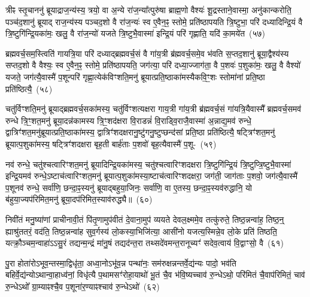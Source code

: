 {\anuvakamend[{विप्रा॑नुमदित॒ इत्या॑ह च॒नास्मै॒ होतो॑प॒भृद्दे॒वता॑ ए॒व त्रीणि॑ च}]}%

त्रीꣴ स्तृ॒चाननु॑ ब्रूयाद्राज॒न्य॑स्य॒ त्रयो॒ वा अ॒न्ये रा॑ज॒न्या᳚त्पुरु॑षा ब्राह्म॒णो वैश्यः॑ शू॒द्रस्ताने॒वास्मा॒ अनु॑कान्करोति॒ पञ्च॑द॒शानु॑ ब्रूयाद् राज॒न्य॑स्य पञ्चद॒शो वै रा॑ज॒न्यः॑ स्व ए॒वैन॒ꣴ॒ स्तोमे॒ प्रति॑\-ष्ठापयति त्रि॒ष्टुभा॒ परि॑ दध्यादिन्द्रि॒यं वै त्रि॒ष्टुगि॑न्द्रि॒यका॑मः॒ खलु॒ वै रा॑ज॒न्यो॑ यजते त्रि॒ष्टुभै॒वास्मा॑ इन्द्रि॒यं परि॑ गृह्णाति॒ यदि॑ का॒मये॑त~(५७)

ब्रह्मवर्च॒सम॒स्त्विति॑ गायत्रि॒या परि॑ दध्याद्ब्रह्मवर्च॒सं वै गा॑य॒त्री ब्र॑ह्मवर्च॒समे॒व भ॑वति स॒प्तद॒शानु॑ ब्रूया॒द्वैश्य॑स्य सप्तद॒शो वै वैश्यः॒ स्व ए॒वैन॒ꣴ॒ स्तोमे॒ प्रति॑\-ष्ठापयति॒ जग॑त्या॒ परि॑ दध्या॒ज्जाग॑ता॒ वै प॒शवः॑ प॒शुका॑मः॒ खलु॒ वै वैश्यो॑ यजते॒ जग॑त्यै॒वास्मै॑ प॒शून्परि॑ गृह्णा॒त्येक॑विꣳशति॒मनु॑ ब्रूयात्प्रति॒ष्ठाका॑मस्यैकवि॒ꣳ॒शः स्तोमा॑नां प्रति॒ष्ठा प्रति॑ष्ठित्यै॒~(५८)

चतु॑र्विꣳशति॒मनु॑ ब्रूयाद्ब्रह्मवर्च॒सका॑मस्य॒ चतु॑र्विꣳशत्यक्षरा गाय॒त्री गा॑य॒त्री ब्र॑ह्मवर्च॒सं गा॑यत्रि॒यैवास्मै᳚ ब्रह्मवर्च॒समव॑ रुन्धे त्रि॒ꣳ॒शत॒\-मनु॑ ब्रूया॒दन्न॑कामस्य त्रि॒ꣳ॒शद॑क्षरा वि॒राडन्नं॑ वि॒राड्वि॒रा\-जै॒\-वा\-स्मा॑ अ॒न्नाद्\-य॒\-मव॑ रुन्धे॒ द्वात्रिꣳ॑शत॒\-मनु॑\-ब्रूयात्प्र\-ति॒ष्ठा\-का॑मस्य॒ द्वात्रिꣳ॑शद\-क्षरा\-नु॒ष्टु॑ग\-नु॒ष्टुप्छन्द॑सां प्रति॒ष्ठा प्रति॑ष्ठित्यै॒ षट्त्रिꣳ॑शत॒मनु॑ ब्रूयात्प॒शुका॑मस्य॒ षट्त्रिꣳ॑शदक्षरा बृह॒ती बार्\mbox{}ह॑ताः प॒शवो॑ बृह॒त्यैवास्मै॑ प॒शू-~(५९)

नव॑ रुन्धे॒ चतु॑श्चत्वारिꣳशत॒मनु॑ ब्रूयादिन्द्रि॒यका॑मस्य॒ चतु॑श्चत्वारिꣳशदक्षरा त्रि॒ष्टुगि॑न्द्रि॒यं त्रि॒ष्टुप्त्रि॒ष्टुभै॒वास्मा॑ इन्द्रि॒यमव॑ रुन्धे॒\-ऽष्टाच॑त्वारिꣳशत॒मनु॑ ब्रूयात्प॒शुका॑मस्या॒ष्टाच॑त्वारिꣳशदक्षरा॒ जग॑ती॒ जाग॑ताः प॒शवो॒ जग॑त्यै॒वास्मै॑ प॒शूनव॑ रुन्धे॒ सर्वा॑णि॒ छन्दा॒ꣴ॒स्यनु॑ ब्रूयाद्बहुया॒जिनः॒ सर्वा॑णि॒ वा ए॒तस्य॒ छन्दा॒ꣴ॒स्यव॑रुद्धानि॒ यो ब॑हुया॒ज्यप॑रिमित॒मनु॑ ब्रूया॒दप॑रिमित॒स्याव॑रुद्ध्यै॥~(६०)

{\anuvakamend[{का॒मये॑त॒ प्रति॑ष्ठित्यै प॒शून्थ्स॒प्तच॑त्वारिꣳशच्च}]}%

निवी॑तं मनु॒ष्या॑णां प्राचीनावी॒तं पि॑तृ॒णामुप॑वीतं दे॒वाना॒मुप॑ व्ययते देवल॒क्ष्ममे॒व तत्कु॑रुते॒ तिष्ठ॒न्नन्वा॑ह॒ तिष्ठ॒न्॒ ह्याश्रु॑ततरं॒ वद॑ति॒ तिष्ठ॒न्नन्वा॑ह सुव॒र्गस्य॑ लो॒कस्या॒भिजि॑त्या॒ आसी॑नो यजत्य॒स्मिन्ने॒व लो॒के प्रति॑ तिष्ठति॒ यत्क्रौ॒ञ्चम॒न्वाहा॑\-ऽऽ\-सु॒रं तद्यन्म॒न्द्रं मा॑नु॒षं तद्यद॑न्त॒रा तथ्सदे॑वमन्त॒रानूच्यꣳ॑ सदेव॒त्वाय॑ वि॒द्वाꣳसो॒ वै~(६१)

पु॒रा होता॑रो\-ऽभूव॒न्तस्मा॒द्विधृ॑ता॒ अध्वा॒नो\-ऽभू॑व॒न्न पन्था॑नः॒ सम॑रुक्षन्नन्तर्वे॒द्य॑न्यः पादो॒ भव॑ति बहिर्वे॒द्य॑न्यो\-ऽथान्वा॒हाध्व॑नां॒ विधृ॑त्यै प॒थामसꣳ॑रोहा॒याथो॑ भू॒तं चै॒व भ॑वि॒ष्यच्चाव॑ रु॒न्धे\-ऽथो॒ परि॑मितं चै॒वाप॑रिमितं॒ चाव॑ रु॒न्धे\-ऽथो᳚ ग्रा॒म्याꣴश्चै॒व प॒शूना॑र॒ण्याꣴश्चाव॑ रु॒न्धे\-ऽथो॑~(६२)

